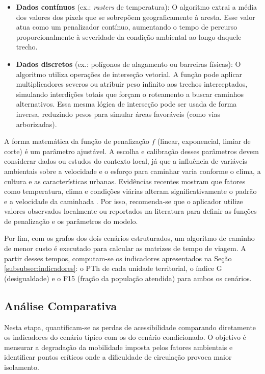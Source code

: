 \begin{itemize}
    \item \textbf{Dados contínuos} (ex.: \textit{rasters} de temperatura): O algoritmo extrai a média dos valores dos pixels que se sobrepõem geograficamente à aresta. Esse valor atua como um penalizador contínuo, aumentando o tempo de percurso proporcionalmente à severidade da condição ambiental ao longo daquele trecho.
    
    \item \textbf{Dados discretos} (ex.: polígonos de alagamento ou barreiras físicas): O algoritmo utiliza operações de interseção vetorial. A função pode aplicar multiplicadores severos ou atribuir peso infinito aos trechos interceptados, simulando interdições totais que forçam o roteamento a buscar caminhos alternativos. Essa mesma lógica de interseção pode ser usada de forma inversa, reduzindo pesos para simular áreas favoráveis (como vias arborizadas).
\end{itemize}

A forma matemática da função de penalização $f$ (linear, exponencial, limiar de corte) é um parâmetro ajustável. A escolha e calibração desses parâmetros devem considerar dados ou estudos do contexto local, já que a influência de variáveis ambientais sobre a velocidade e o esforço para caminhar varia conforme o clima, a cultura e as características urbanas. Evidências recentes mostram que fatores como temperatura, clima e condições viárias alteram significativamente o padrão e a velocidade da caminhada \cite{LIANG2020106811,Obuchi2021}. Por isso, recomenda-se que o aplicador utilize valores observados localmente ou reportados na literatura para definir as funções de penalização e os parâmetros do modelo.

Por fim, com os grafos dos dois cenários estruturados, um algoritmo de caminho de menor custo é executado para calcular as matrizes de tempo de viagem. A partir desses tempos, computam-se os indicadores apresentados na Seção \ref{subsubsec:indicadores}: o PTh de cada unidade territorial, o índice G (desigualdade) e o F15 (fração da população atendida) para ambos os cenários.

\subsection{Análise Comparativa}
\label{subsec:comparative}

Nesta etapa, quantificam-se as perdas de acessibilidade comparando diretamente os indicadores do cenário típico com os do cenário condicionado. O objetivo é mensurar a degradação da mobilidade imposta pelos fatores ambientais e identificar pontos críticos onde a dificuldade de circulação provoca maior isolamento.

